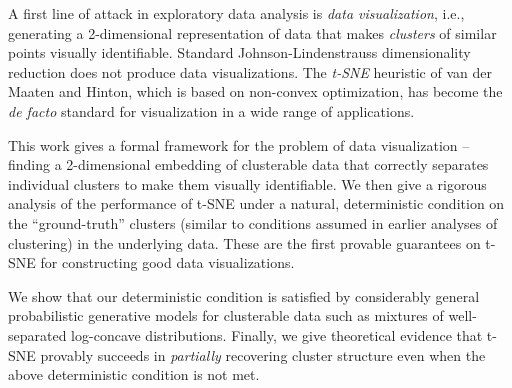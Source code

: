 
A first line of attack in exploratory data analysis is \emph{data visualization}, i.e., generating a 2-dimensional representation of data that makes \emph{clusters} of similar points visually identifiable. Standard Johnson-Lindenstrauss dimensionality reduction does not produce data visualizations. The \emph{t-SNE} heuristic of van der Maaten and Hinton, which is based on non-convex optimization, has become the \emph{de facto} standard for visualization in a wide range of applications.


This work gives a formal framework for the problem of data visualization -- finding a 2-dimensional embedding of clusterable data that correctly separates individual clusters to make them visually identifiable. We then give a rigorous analysis of the performance of t-SNE under a natural, deterministic condition on the ``ground-truth'' clusters (similar to conditions assumed in earlier analyses of clustering) in the underlying data. These are the first provable guarantees on t-SNE for constructing good data visualizations. 

We show that our deterministic condition is satisfied by considerably general probabilistic generative models for clusterable data such as mixtures of well-separated log-concave distributions. Finally, we give theoretical evidence that t-SNE provably succeeds in \emph{partially} recovering cluster structure even when the above deterministic condition is not met. 

 



 